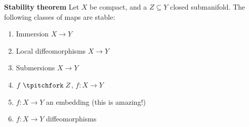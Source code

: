\begin{theorem}
  \textbf{Stability theorem}
  \newline Let $X$ be compact, and a $Z \subseteq Y$ closed submanifold. The following classes of maps are stable:
    \begin{enumerate}[(1)]
      \item Immersion $X\to Y$
      \item Local diffeomorphisms $X\to Y$
      \item Submersions $X\to Y$
      \item $f \transv Z$, $f: X \to Y$
      \item $f: X \to Y$ an embedding (this is amazing!)
      \item $f: X \to Y$ diffeomorphisms
    \end{enumerate}
\end{theorem}
